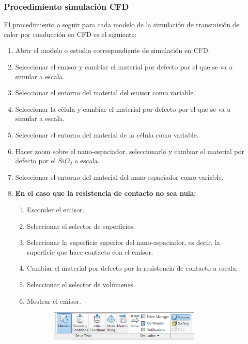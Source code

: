 \subsubsection{Procedimiento simulación CFD}
El procedimiento a seguir para cada modelo de la simulación de transmisión de calor por conducción en CFD es el siguiente:
\begin{enumerate}
	\item Abrir el modelo o estudio correspondiente de simulación en CFD.
	\item Seleccionar el emisor y cambiar el material por defecto por el que se va a simular a escala.
	\item Seleccionar el entorno del material del emisor como variable.
	\item Seleccionar la célula y cambiar el material por defecto por el que se va a simular a escala.
	\item Seleccionar el entorno del material de la célula como variable.
	\item Hacer zoom sobre el nano-espaciador, seleccionarlo y cambiar el material por defecto por el $SiO_2$ a escala.
	\item Seleccionar el entorno del material del nano-espaciador como variable.
	\item \textbf{En el caso que la resistencia de contacto no sea nula:}
	\begin{enumerate}
		\item Esconder el emisor.
		\item Seleccionar el selector de superficies.
		\item Seleccionar la superficie superior del nano-espaciador, es decir, la superficie que hace contacto con el emisor.
		\item Cambiar el material por defecto por la resistencia de contacto a escala.
		\item Seleccionar el selector de volúmenes.
		\item Mostrar el emisor.
	\end{enumerate}
	\begin{figure}[H]
	\centering
	\begin{subfigure}[b]{0.48\textwidth}
		\centering
			\includegraphics[width=0.9\textwidth]{figuras/Procedimiento_Simulaciones/Conduccion/paneles.png}

\end{subfigure}
\end{figure}
\end{enumerate}
